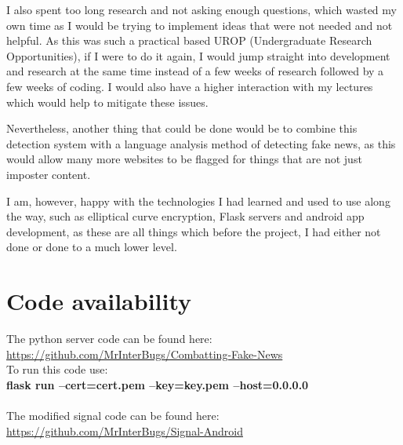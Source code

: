 \documentclass[11pt,a4paper]{report}
\begin{document}
I also spent too long research and not asking enough questions, which wasted my own time as I would be trying to implement ideas that were not needed and not helpful. As this was such a practical based UROP (Undergraduate Research Opportunities), if I were to do it again, I would jump straight into development and research at the same time instead of a few weeks of research followed by a few weeks of coding. I would also have a higher interaction with my lectures which would help to mitigate these issues.

Nevertheless, another thing that could be done would be to combine this detection system with a language analysis method of detecting fake news, as this would allow many more websites to be flagged for things that are not just imposter content.

I am, however, happy with the technologies I had learned and used to use along the way, such as elliptical curve encryption, Flask servers and android app development, as these are all things which before the project, I had either not done or done to a much lower level.
\newpage
\section{Code availability}
The python server code can be found here: \\ \url{https://github.com/MrInterBugs/Combatting-Fake-News} \\ To run this code use: \\ \textbf{flask run --cert=cert.pem --key=key.pem --host=0.0.0.0} \\ \\ The modified signal code can be found here: \\ \url{https://github.com/MrInterBugs/Signal-Android}
\newpage

\end{document}

